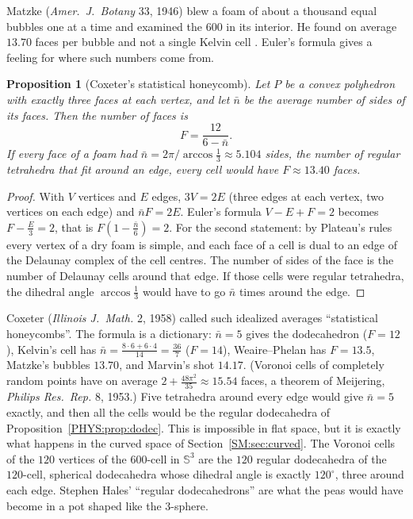 \documentclass[11pt,openany]{book}
\theoremstyle{plain}
\newtheorem{proposition}[theorem]{Proposition}
\theoremstyle{definition}
\theoremstyle{remark}
\newcommand{\Sph}{\mathbb{S}}          %
\begin{document}
Matzke (\emph{Amer.\ J.\ Botany} 33, 1946) blew a foam of about a thousand equal bubbles one at a time and
examined the $600$ in its interior. He found on average $13.70$ faces per bubble and not a single Kelvin cell
. Euler's formula gives a feeling for where such numbers come from.

\begin{proposition}[Coxeter's statistical honeycomb]\label{PHYS:prop:coxeter}
Let $P$ be a convex polyhedron with exactly three faces at each vertex, and let $\bar n$ be the average
number of sides of its faces. Then the number of faces is
\[
  F=\frac{12}{6-\bar n}.
\]
If every face of a foam had $\bar n=2\pi/\arccos\frac13\approx5.104$ sides, the number of regular
tetrahedra that fit around an edge, every cell would have $F\approx13.40$ faces.
\end{proposition}

\begin{proof}
With $V$ vertices and $E$ edges, $3V=2E$ (three edges at each vertex, two vertices on each edge) and $\bar
nF=2E$. Euler's formula $V-E+F=2$ becomes $F-\frac E3=2$, that is $F(1-\frac{\bar n}6)=2$. For the second
statement: by Plateau's rules every vertex of a dry foam is simple, and each face of a cell is dual to
an edge of the Delaunay complex of the cell centres. The number of sides of the face is the number of
Delaunay cells around that edge. If those cells were regular tetrahedra, the dihedral angle
$\arccos\frac13$ would have to go $\bar n$ times around the edge.
\end{proof}

Coxeter (\emph{Illinois J.\ Math.} 2, 1958) called such idealized averages ``statistical honeycombs''. The
formula is a dictionary: $\bar n=5$ gives the dodecahedron ($F=12$), Kelvin's cell has $\bar
n=\frac{8\cdot6+6\cdot4}{14}=\frac{36}7$ ($F=14$), Weaire--Phelan has $F=13.5$, Matzke's bubbles $13.70$,
and Marvin's shot $14.17$. (Voronoi cells of completely random points have on average
$2+\frac{48\pi^2}{35}\approx15.54$ faces, a theorem of Meijering, \emph{Philips Res.\ Rep.} 8, 1953.) Five tetrahedra around every edge would give
$\bar n=5$ exactly, and then all the cells would be the regular dodecahedra of
Proposition~\ref{PHYS:prop:dodec}. This is impossible in flat space, but it is exactly what happens in the
curved space of Section~\ref{SM:sec:curved}. The Voronoi cells of the $120$ vertices of the $600$-cell in
$\Sph^3$ are the $120$ regular dodecahedra of the $120$-cell, spherical dodecahedra whose dihedral angle is exactly
$120^\circ$, three around each edge. Stephen Hales' ``regular dodecahedrons'' are
what the peas would have become in a pot shaped like the $3$-sphere.
\end{document}
